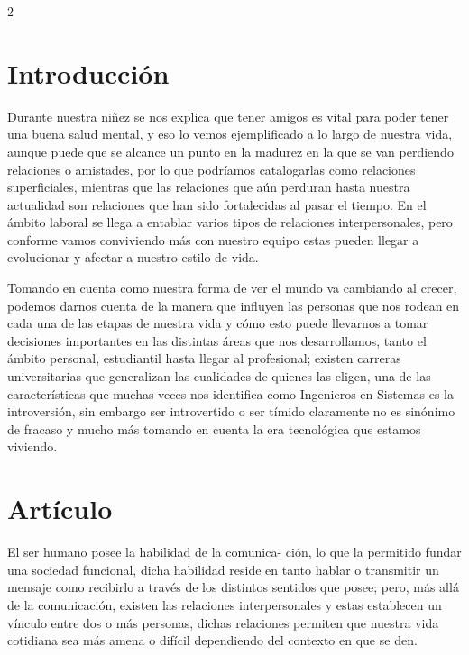 \documentclass[12pt,spanish,Letterpaper,openany]{book}
\begin{document}
\begin {multicols}{2}

\hypertarget{introducciuxf3n-8}{%
\section{Introducción}\label{introducciuxf3n-8}}

Durante nuestra niñez se nos explica que tener amigos es vital para poder tener una buena salud mental, y eso lo vemos ejemplificado a lo largo de nuestra vida, aunque puede que se alcance un punto en la madurez en la que se van perdiendo relaciones o amistades, por lo que podríamos catalogarlas como relaciones superficiales, mientras que las relaciones que aún perduran hasta nuestra actualidad son relaciones que han sido fortalecidas al pasar el tiempo. En el ámbito laboral se llega a entablar varios tipos de relaciones interpersonales, pero conforme vamos conviviendo más con nuestro equipo estas pueden llegar a evolucionar y afectar a nuestro estilo de vida.

Tomando en cuenta como nuestra forma de ver el mundo va cambiando al crecer, podemos darnos cuenta de la manera que influyen las personas que nos rodean en cada una de las etapas de nuestra vida y cómo esto puede llevarnos a tomar decisiones importantes en las distintas áreas que nos desarrollamos, tanto el ámbito personal, estudiantil hasta llegar al profesional; existen carreras universitarias que generalizan las cualidades de quienes las eligen, una de las características que muchas veces nos identifica como Ingenieros en Sistemas es la introversión, sin embargo ser introvertido o ser tímido claramente no es sinónimo de fracaso y mucho más tomando en cuenta la era tecnológica que estamos viviendo.

\hypertarget{artuxedculo-3}{%
\section{Artículo}\label{artuxedculo-3}}

El ser humano posee la habilidad de la comunica-
ción, lo que la permitido fundar una sociedad funcional, dicha habilidad reside en tanto hablar o transmitir un mensaje como recibirlo a través de los distintos sentidos que posee; pero, más allá de la comunicación, existen las relaciones interpersonales y estas establecen un vínculo entre dos o más personas, dichas relaciones permiten que nuestra vida cotidiana sea más amena o difícil dependiendo del contexto en que se den.


\end{multicols}
\end{document}
